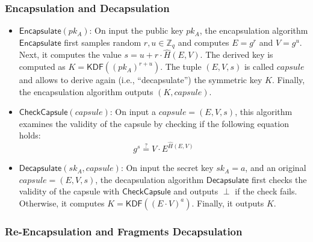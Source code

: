\documentclass{amsart}
\begin{document}
\subsubsection{Encapsulation and Decapsulation}

\begin{itemize}
	\item $\mathsf{Encapsulate}(pk_A)$: On input the public key $pk_A$, the encapsulation algorithm $\mathsf{Encapsulate}$ first samples random $r, u \in \mathbb Z_q$ and computes $E = g^r$ and $V = g^u$. 
	Next, it computes the value $s = u + r \cdot \hat H(E, V)$. 
	The derived key is computed as $K = \mathsf{KDF}((pk_A)^{r + u})$. 
	The tuple $(E, V, s)$ is called $capsule$ and allows to derive again (i.e., ``decapsulate'') the symmetric key $K$. 
	Finally, the encapsulation algorithm outputs $(K, capsule)$.	
	
	\item $\mathsf{CheckCapsule}(capsule)$: On input a $capsule = (E, V, s)$, this algorithm examines the validity of the capsule by checking if the following equation holds:
	$$ g^s \stackrel{?}{=} V \cdot E^{\hat H(E, V)}$$
	
	\item $\mathsf{Decapsulate}(sk_A, capsule)$: On input the secret key $sk_A = a$, and an original $capsule = (E,V,s)$, the decapsulation algorithm $\mathsf{Decapsulate}$ first checks the validity of the capsule with $\mathsf{CheckCapsule}$ and outputs $\perp$ if the check fails. Otherwise, it computes $K = \mathsf{KDF}((E\cdot V)^{a})$. Finally, it outputs $K$.
	
	\end{itemize}

\subsubsection{Re-Encapsulation and Fragments Decapsulation}%
\end{document}
